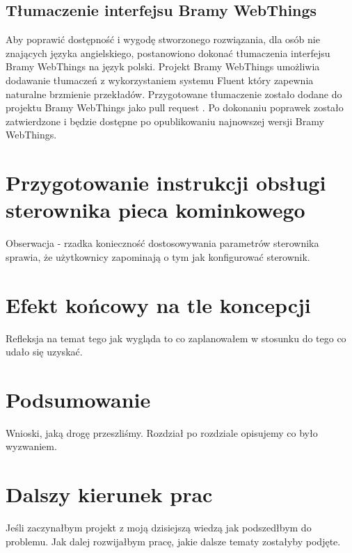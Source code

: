 \documentclass[11pt]{report}
\begin{document}
 \section{Tłumaczenie interfejsu Bramy WebThings}
 Aby poprawić dostępność i wygodę stworzonego rozwiązania, dla osób nie znających języka angielskiego, postanowiono dokonać tłumaczenia interfejsu Bramy WebThings na język polski. Projekt Bramy WebThings umożliwia dodawanie tłumaczeń z wykorzystaniem systemu Fluent \cite{fluent2020} który zapewnia naturalne brzmienie przekładów. Przygotowane tłumaczenie zostało dodane do projektu Bramy WebThings jako pull request \cite{gatewaypl2019}. Po dokonaniu poprawek zostało zatwierdzone i będzie dostępne po opublikowaniu najnowszej wersji Bramy WebThings.

 \chapter{Przygotowanie instrukcji obsługi sterownika pieca kominkowego}
 Obserwacja - rzadka konieczność dostosowywania parametrów sterownika sprawia, że użytkownicy zapominają o tym jak konfigurować sterownik.
 
 
 \chapter{Efekt końcowy na tle koncepcji}
 Refleksja na temat tego jak wygląda to co zaplanowałem w stosunku do tego co udało się uzyskać.
 
 
 \chapter{Podsumowanie}
 Wnioski, jaką drogę przeszliśmy. Rozdział po rozdziale opisujemy co było wyzwaniem.
 
 
 \chapter{Dalszy kierunek prac}
 Jeśli zaczynałbym projekt z moją dzisiejszą wiedzą jak podszedłbym do problemu. Jak dalej rozwijałbym pracę, jakie dalsze tematy zostałyby podjęte. 



\end{document}
